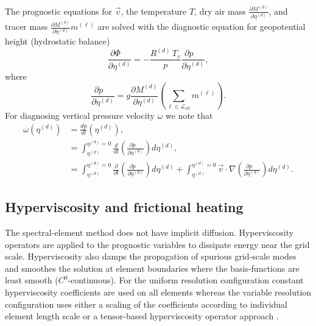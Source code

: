 \documentclass{agujournal}
\begin{document}
{The prognostic equations for $\vec{v}$, the temperature $T$, dry air mass ${\frac{\partial {M^{(d)}}}{\partial \eta^{(d)}}}$, and tracer mass ${\frac{\partial {M^{(d)}}}{\partial \eta^{(d)}}} m^{(\ell)}$ are solved with the diagnostic equation for geopotential height (hydrostatic balance)
\begin{equation}
\frac{\partial \Phi\quad }{\partial \eta^{(d)}}=-\frac{R^{(d)} \,T_v}{p}\frac{\partial p\quad }{\partial \eta^{(d)}},\label{eq:phi_1}
\end{equation}
where
\begin{equation}
\frac{\partial p\quad }{\partial \eta^{(d)}}=g\frac{\partial M^{(d)}}{\partial \eta^{(d)}}\left( \sum_{\ell \in \mathcal{L}_{all}} m^{(\ell)}\right).
\end{equation}
For diagnosing vertical pressure velocity $\omega$ we note that
\begin{align}
\omega(\eta^{(d)})&=\frac{dp}{dt}(\eta^{(d)}),\\
      &=\int_{\eta^{(d)}}^{\eta^{(d)}=0}\frac{d}{dt}\left( \frac{\partial p\quad }{\partial \eta^{(d)}}\right)d\eta^{(d)},\\
      &=\int_{\eta^{(d)}}^{\eta^{(d)}=0}\frac{\partial}{\partial t}\left( \frac{\partial p\quad }{\partial \eta^{(d)}}\right)d\eta^{(d)}+\int_{\eta^{(d)}}^{\eta^{(d)}=0} \vec{v}\cdot \nabla \left( \frac{\partial p\quad }{\partial \eta^{(d)}}\right)d\eta^{(d)}.\label{eq:omega}
\end{align}
%
\subsection{Hyperviscosity and frictional heating}\label{sec:hypvervisfric}
The spectral-element method does not have implicit diffusion. Hyperviscosity operators are applied to the prognostic variables to dissipate energy near the grid scale. Hyperviscosity also damps the propagation of spurious grid-scale modes \citep{AW2009SIAM} and smoothes the solution at element boundaries where the basis-functions are least smooth ($C^0$-continuous). For the uniform resolution configuration constant hyperviscosity coefficients are used on all elements whereas the variable resolution configuration uses either a scaling of the coefficients according to individual element length scale \citep{ZetAl2014JCb} or a tensor-based hyperviscosity operator approach \citep{GetAl2014GMD}.
}
\end{document}
